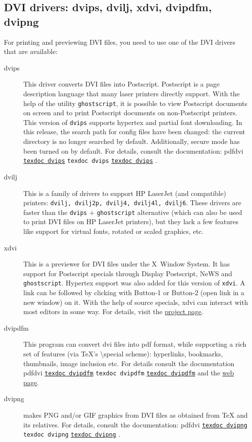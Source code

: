 \documentclass[11pt,a4paper]{article}
\newcommand{\pdfext}{pdf}
\newcommand{\dviext}{dvi}
\let\docext=\pdfext
\let\docext=\dviext
\newcommand{\dlink}[3]{%
  \ifpdf
    \ifx\pdfext#3
      \href{#1/#2.#3}{\texttt{texdoc #2}}%
    \else
      \texttt{texdoc #2}%
    \fi
  \else
     \href{#1/#2.#3}{\mbox{\texttt{texdoc #2}}}%
  \fi}
\begin{document}
\subsection{DVI drivers: dvips, dvilj, xdvi, dvipdfm, dvipng}
For printing and previewing DVI files, you need to use one of the DVI
drivers that are available:
\begin{description}
\item [dvips] This driver converts DVI files into Postscript.
  Postscript is a page description language that many laser printers
  directly support. With the help of the utility \texttt{ghostscript},
  it is possible to view Postscript documents on screen and to print
  Postscript documents on non-Postscript printers. This version of
  \texttt{dvips} supports hypertex and partial font downloading.  In
  this release, the search path for config files have been changed:
  the current directory is no longer searched by default.
  Additionally, secure mode has been turned on by default. For
  details, consult the documentation:
  \dlink{../../../texmf-dist/doc/programs}{dvips}{\dviext}.
\item [dvilj] This is a family of drivers to support HP LaserJet (and
  compatible) printers: \texttt{dvilj, dvilj2p, dvilj4, dvilj4l,
    dvilj6}. These drivers are faster than the \texttt{dvips} +
  \texttt{ghostscript} alternative (which can also be used to print
  DVI files on HP LaserJet printers), but they lack a few features
  like support for virtual fonts, rotated or scaled graphics, etc.
\item [xdvi] This is a previewer for DVI files under the X~Window
  System. It has support for Postscript specials through Display
  Postscript, NeWS and \texttt{ghostscript}. Hypertex support was also
  added for this version of \texttt{xdvi}. A link can be followed by
  clicking with Button-1 or Button-2 (open link in a new window) on
  it. With the help of source specials, xdvi can interact with most
  editors in some way. For details, visit the
  \href{http://xdvi.sourceforge.net/inverse-search.html}{project
    page}.
\item [dvipdfm] This program can convert dvi files into pdf format,
  while supporting a rich set of features (via TeX's
  \textbackslash special scheme): hyperlinks, bookmarks, thumbnails,
  image inclusion etc. For details consult the documentation
  \dlink{../../../texmf-dist/doc/programs}{dvipdfm}{\docext} and the
  \href{http://gaspra.kettering.edu/dvipdfm/}{web page}.
\item [dvipng] makes PNG and/or GIF graphics from DVI files as obtained
  from TeX and its relatives. For details, consult the documentation:
  \dlink{../../../texmf-dist/doc/programs}{dvipng}{\docext}.

\end{description}
\end{document}
